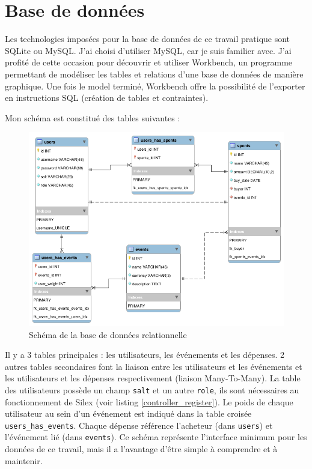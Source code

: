 \documentclass[a4paper, 12pt]{article}
\begin{document}
\section{Base de données}
Les technologies imposées pour la base de données de ce travail pratique sont SQLite ou MySQL. J'ai choisi 
d'utiliser MySQL, car je suis familier avec. J'ai profité de cette occasion pour découvrir et utiliser Workbench, 
un programme permettant de modéliser les tables et relations d'une base de données de manière graphique. Une fois 
le model terminé, Workbench offre la possibilité de l'exporter en instructions SQL (création de tables et 
contraintes).
\bigbreak

Mon schéma est constitué des tables suivantes :
\begin{figure}
	\begin{center}
		\includegraphics[width=1.0\textwidth]{database.png}
	\end{center}
	\caption{Schéma de la base de données relationnelle}
\end{figure}
Il y a 3 tables principales : les utilisateurs, les événements et les dépenses. 2 autres tables secondaires 
font la liaison entre les utilisateurs et les événements et les utilisateurs et les dépenses respectivement 
(liaison Many-To-Many). La table des utilisateurs possède un champ \texttt{salt} et un autre 
\texttt{role}, ils sont nécessaires au fonctionnement de Silex (voir listing \ref{controller_register}). 
Le poids de chaque utilisateur au sein d'un événement est indiqué dans la table croisée 
\texttt{users_has_events}. 
Chaque dépense référence l'acheteur (dans \texttt{users}) et l'événement lié (dans \texttt
{events}). Ce schéma représente l'interface minimum pour les données de ce travail, mais il a l'avantage 
d'être simple à comprendre et à maintenir.
\end{document}
